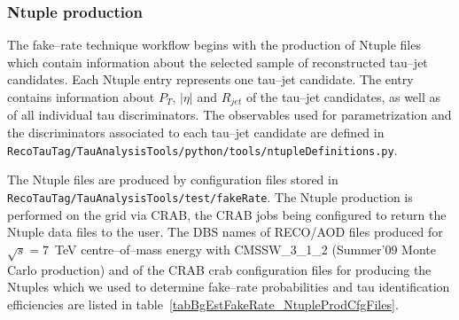 \subsubsection{Ntuple production}
\label{secAppendixNtupleProduction}

The fake--rate technique workflow begins with the production of Ntuple files
which contain information about the selected sample of reconstructed tau--jet candidates.
Each Ntuple entry represents one tau--jet candidate.
The entry contains information about $P_{T}$, $\vert\eta\vert$ and $R_{jet}$ of the tau--jet candidates,
as well as of all individual tau discriminators.
The observables used for parametrization and the discriminators associated to each tau--jet candidate
are defined in \newline
\verb|RecoTauTag/TauAnalysisTools/python/tools/ntupleDefinitions.py|.  

The Ntuple files are produced by configuration files stored in \newline
\verb|RecoTauTag/TauAnalysisTools/test/fakeRate|.  
The Ntuple production is performed on the grid via CRAB,
the CRAB jobs being configured to return the Ntuple data files to the user.
The DBS names of RECO/AOD files produced for $\sqrt{s} = 7$~TeV centre--of--mass energy with CMSSW\_3\_1\_2
(Summer'09 Monte Carlo production)
and of the CRAB crab configuration files 
for producing the Ntuples which we used to determine 
fake--rate probabilities and tau identification efficiencies 
are listed in table~\ref{tabBgEstFakeRate_NtupleProdCfgFiles}.

